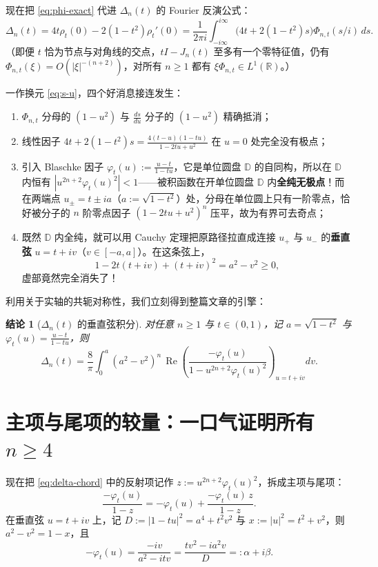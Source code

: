 \documentclass[UTF8,fontset=windows,a4paper,11pt]{ctexart}
\newcommand{\R}{\mathbb{R}}
\newcommand{\D}{\mathbb{D}}
\newcommand{\RePart}{\operatorname{Re}}
\newtheorem{claim}{结论}
\begin{document}
现在把 \eqref{eq:phi-exact} 代进 $\Delta_n(t)$ 的 Fourier 反演公式：
\[
    \Delta_n(t) = 4t\rho_t(0)-2(1-t^2)\rho_t'(0)
    = \frac{1}{2\pi i}\int_{-i\infty}^{i\infty}\bigl(4t+2(1-t^2)s\bigr)\Phi_{n,t}(s/i)\,ds.
\]
（即便 $t$ 恰为节点与对角线的交点，$tI-J_n(t)$ 至多有一个零特征值，仍有 $\Phi_{n,t}(\xi)=O(|\xi|^{-(n+2)})$，对所有 $n\ge 1$ 都有 $\xi\Phi_{n,t}\in L^1(\R)$。）

一作换元 \eqref{eq:s-u}，四个好消息接连发生：
\begin{enumerate}
    \item $\Phi_{n,t}$ 分母的 $(1-u^2)$ 与 $\frac{ds}{du}$ 分子的 $(1-u^2)$ 精确抵消；
    \item 线性因子 $4t+2(1-t^2)s=\frac{4(t-u)(1-tu)}{1-2tu+u^2}$ 在 $u=0$ 处完全没有极点；
    \item 引入 Blaschke 因子 $\varphi_t(u):=\frac{u-t}{1-tu}$，它是单位圆盘 $\D$ 的自同构，所以在 $\D$ 内恒有 $|u^{2n+2}\varphi_t(u)^2|<1$——被积函数在开单位圆盘 $\D$ 内\textbf{全纯无极点}！而在两端点 $u_\pm=t\pm ia$（$a:=\sqrt{1-t^2}$）处，分母在单位圆上只有一阶零点，恰好被分子的 $n$ 阶零点因子 $(1-2tu+u^2)^n$ 压平，故为有界可去奇点；
    \item 既然 $\D$ 内全纯，就可以用 Cauchy 定理把原路径拉直成连接 $u_+$ 与 $u_-$ 的\textbf{垂直弦} $u=t+iv$（$v\in[-a,a]$）。在这条弦上，
    \[
        1-2t(t+iv)+(t+iv)^2 = a^2-v^2 \ge 0,
    \]
    虚部竟然完全消失了！
\end{enumerate}

利用关于实轴的共轭对称性，我们立刻得到整篇文章的引擎：

\begin{claim}[$\Delta_n(t)$ 的垂直弦积分]
    \label{clm:chord}
    对任意 $n\ge 1$ 与 $t\in(0,1)$，记 $a=\sqrt{1-t^2}$ 与 $\varphi_t(u)=\frac{u-t}{1-tu}$，则
    \begin{equation}
        \Delta_n(t)
        = \frac{8}{\pi}\int_0^a (a^2-v^2)^n\,
          \RePart\!\left(\frac{-\varphi_t(u)}{1-u^{2n+2}\varphi_t(u)^2}\right)_{u=t+iv}dv.
        \label{eq:delta-chord}
    \end{equation}
\end{claim}

\section{主项与尾项的较量：一口气证明所有 $n\ge 4$}
\label{sec:n4}

现在把 \eqref{eq:delta-chord} 中的反射项记作 $z:=u^{2n+2}\varphi_t(u)^2$，拆成主项与尾项：
\[
    \frac{-\varphi_t(u)}{1-z} = -\varphi_t(u) + \frac{-\varphi_t(u)\,z}{1-z}.
\]
在垂直弦 $u=t+iv$ 上，记 $D:=|1-tu|^2=a^4+t^2v^2$ 与 $x:=|u|^2=t^2+v^2$，则 $a^2-v^2=1-x$，且
\[
    -\varphi_t(u) = \frac{-iv}{a^2-itv} = \frac{tv^2-ia^2v}{D} =: \alpha+i\beta.
\]
\end{document}
